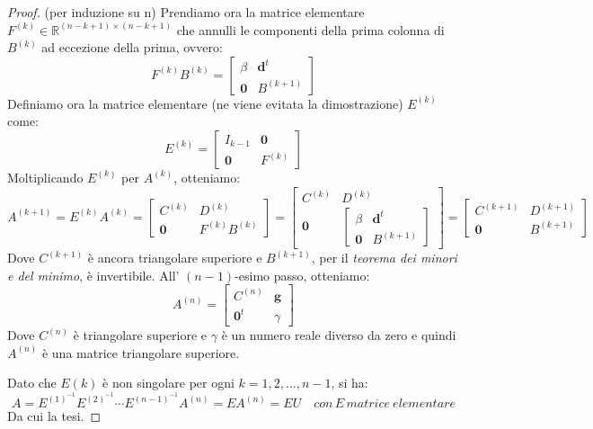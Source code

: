 \begin{proof}{(per induzione su n)}
    Prendiamo ora la matrice elementare $F^{(k)} \in \mathbb{R}^{(n-k+1) \times (n-k+1)}$ che annulli le componenti della prima colonna di $B^{(k)}$ ad 
    eccezione della prima, ovvero:
    \[
    F^{(k)} B^{(k)} = \begin{bmatrix}
    \beta & \mathbf{d}^t \\
    \mathbf{0} & B^{(k+1)}
    \end{bmatrix}
    \]
    Definiamo ora la matrice elementare (ne viene evitata la dimostrazione) $E^{(k)}$ come:
    \[
    E^{(k)} = \begin{bmatrix}
    I_{k-1} & \mathbf{0} \\
    \mathbf{0} & F^{(k)}
    \end{bmatrix}
    \]
    Moltiplicando $E^{(k)}$ per $A^{(k)}$, otteniamo:
    \[A^{(k+1)} = E^{(k)} A^{(k)} = \begin{bmatrix}
    C^{(k)} & D^{(k)} \\
    \mathbf{0} & F^{(k)} B^{(k)}
    \end{bmatrix} =
    \begin{bmatrix} C^{(k)} & D^{(k)} \\ \mathbf{0} & \begin{bmatrix}
    \beta & \textbf{d}^t \\
    \textbf{0} & B^{(k+1)}
    \end{bmatrix} \end{bmatrix} =
    \begin{bmatrix} C^{(k+1)} & D^{(k+1)} \\ \mathbf{0} & B^{(k+1)} \end{bmatrix}
    \]
    Dove $C^{(k+1)}$ è ancora triangolare superiore e $B^{(k+1)}$, per il \textit{teorema dei minori e del minimo}, è invertibile.
    All' $(n-1)$-esimo passo, otteniamo:
    \[A^{(n)} = \begin{bmatrix} C^{(n)} & \textbf{g} \\ \mathbf{0}^t &\gamma \end{bmatrix}\]
    Dove $C^{(n)}$ è triangolare superiore e $\gamma$ è un numero reale diverso da zero e quindi $A^{(n)}$
    è una matrice triangolare superiore.
    
    Dato che $E(k)$ è non singolare per ogni $k = 1, 2, \ldots, n-1$, si ha:
    \[
        A = E^{(1)^{-1}} E^{(2)^{-1}} \cdots E^{(n-1)^{-1}} A^{(n)} = E A^{(n)} = EU \quad con \, E \, \mathit{matrice\ elementare}
    \]
    Da cui la tesi.
\end{proof}

